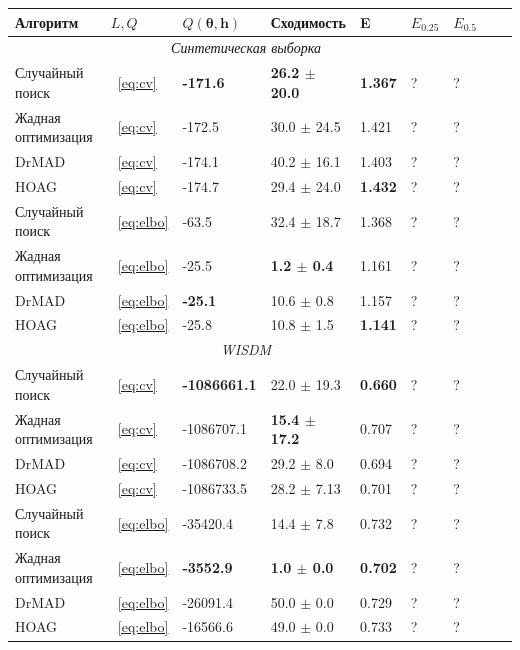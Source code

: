 \documentclass[12pt]{article}
\begin{document}
\begin{table}
\small
\begin{tabularx}{\textwidth}{ |X|X|X|X|X|X|X|X|X|}

\hline
\textbf{Алгоритм} & $L, Q$  & $Q(\boldsymbol{\theta}, \mathbf{h})$ & Сходимость & E & $E_{0.25}$ & $E_{0.5}$\\ 
\hline
\multicolumn{7}{|c|}{\textit{Синтетическая выборка}}  \\
\hline
Случайный поиск & ~\eqref{eq:cv} & \bf -171.6  &\bf 26.2 $\pm$ 20.0  & \bf 1.367 & ? & ? \\
\hline
Жадная оптимизация & ~\eqref{eq:cv} & -172.5 & 30.0 $\pm$ 24.5 & 1.421 & ? & ? \\
\hline
DrMAD & ~\eqref{eq:cv} & -174.1 & 40.2 $\pm$ 16.1 &  1.403 & ? & ?\\
\hline
HOAG & ~\eqref{eq:cv} &-174.7 & 29.4 $\pm$ 24.0 &   \bf 1.432  & ? & ?\\
\hline
Случайный поиск & ~\eqref{eq:elbo} & -63.5  & 32.4 $\pm$ 18.7  & 1.368 & ? & ?  \\
\hline
Жадная оптимизация & ~\eqref{eq:elbo} & -25.5 & \bf 1.2 $\pm$ 0.4 & 1.161 & ? & ?\\
\hline
DrMAD & ~\eqref{eq:elbo} & \bf -25.1 &  10.6 $\pm$ 0.8 &  1.157 & ? & ?\\
\hline
HOAG & ~\eqref{eq:elbo} &-25.8 & 10.8 $\pm$ 1.5&   \bf 1.141  & ? & ?\\
\hline


\multicolumn{7}{|c|}{\textit{WISDM}}  \\
\hline
Случайный поиск & ~\eqref{eq:cv} & \bf -1086661.1  & 22.0 $\pm$ 19.3  & \bf 0.660 & ? & ? \\
\hline
Жадная оптимизация & ~\eqref{eq:cv} & -1086707.1 & \bf 15.4 $\pm$ 17.2 & 0.707 & ? & ? \\
\hline
DrMAD & ~\eqref{eq:cv} & -1086708.2 & 29.2 $\pm$ 8.0 &  0.694 & ? & ? \\
\hline
HOAG & ~\eqref{eq:cv} & -1086733.5 & 28.2 $\pm$ 7.13&   0.701 & ? & ? \\
\hline
Случайный поиск & ~\eqref{eq:elbo} & -35420.4 &   14.4 $\pm$ 7.8  &   0.732 & ? & ? \\
\hline
Жадная оптимизация & ~\eqref{eq:elbo} & \bf -3552.9 &\bf 1.0 $\pm$ 0.0  &   \bf 0.702 & ? & ? \\
\hline
DrMAD & ~\eqref{eq:elbo} & -26091.4 &   50.0 $\pm$ 0.0  & 0.729 & ? & ? \\
\hline
HOAG & ~\eqref{eq:elbo} &  -16566.6 & 49.0 $\pm$ 0.0  &  0.733 & ? & ? \\
\hline




\end{tabularx}
\end{table}
\end{document}
